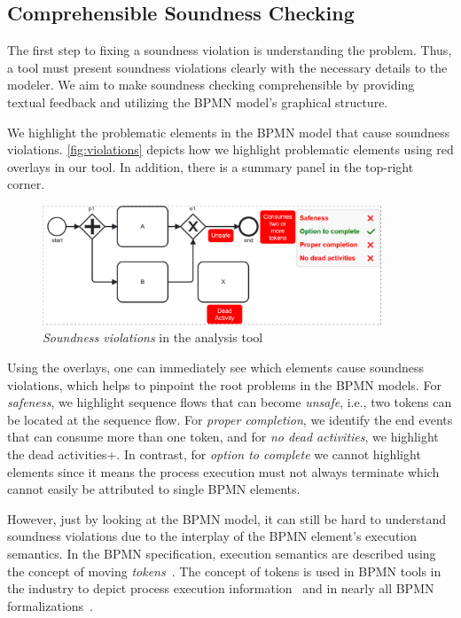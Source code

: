 \documentclass[runningheads]{llncs}
\begin{document}


\subsection{Comprehensible Soundness Checking}

The first step to fixing a soundness violation is understanding the problem.
Thus, a tool must present soundness violations clearly with the necessary details to the modeler.
We aim to make soundness checking comprehensible by providing textual feedback and utilizing the BPMN model's graphical structure.

We highlight the problematic elements in the BPMN model that cause soundness violations.
\autoref{fig:violations} depicts how we highlight problematic elements using red overlays in our tool.
In addition, there is a summary panel in the top-right corner.

\begin{figure}[ht]
	\centering
	\includegraphics[width=0.9\textwidth]{images/violations}
	\caption{\textit{Soundness violations} in the analysis tool}
	\label{fig:violations}
\end{figure}

Using the overlays, one can immediately see which elements cause soundness violations, which helps to pinpoint the root problems in the BPMN models.
For \textit{safeness}, we highlight sequence flows that can become \textit{unsafe}, i.e., two tokens can be located at the sequence flow.
For \textit{proper completion}, we identify the end events that can consume more than one token, and for \textit{no dead activities}, we highlight the dead activities+.
In contrast, for \textit{option to complete} we cannot highlight elements since it means the process execution must not always terminate which cannot easily be attributed to single BPMN elements.

However, just by looking at the BPMN model, it can still be hard to understand soundness violations due to the interplay of the BPMN element's execution semantics.
In the BPMN specification, execution semantics are described using the concept of moving \textit{tokens}~\cite{objectmanagementgroupBusinessProcessModel2013}.
The concept of tokens is used in BPMN tools in the industry to depict process execution information~\cite{camundaservicesgmbhBpmnjsTokenSimulation2024} and in nearly all BPMN formalizations~\cite{corradiniFormalApproachAnalysis2021,corradiniFormalisingAnimatingMultiple2022,houhouFirstOrderLogicVerification2022,krauterFormalizationAnalysisBPMN2023,krauterHigherorderTransformationApproach2023}.
\end{document}
